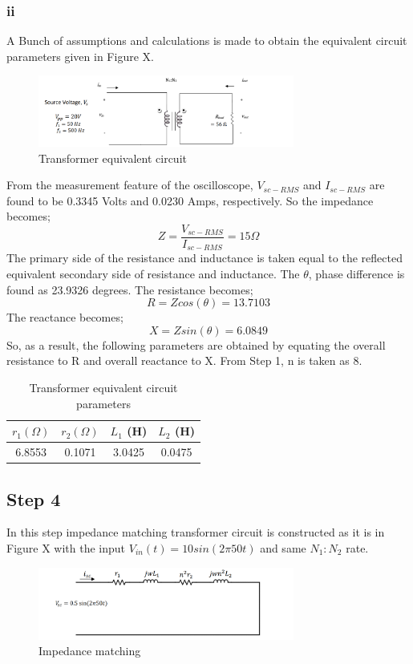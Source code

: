 \documentclass[letterpaper,12pt]{article}
\begin{document}
\subsubsection{ii}
A Bunch of assumptions and calculations is made to obtain the equivalent circuit parameters given in Figure X.
\begin{figure}[H]
    \centering
    \includegraphics[width = 0.75\textwidth]{2.png}
    \caption{Transformer equivalent circuit}
\end{figure} 
From the measurement feature of the oscilloscope, \(V_{sc-RMS}\) and \(I_{sc-RMS}\) are found to be 0.3345 Volts and 0.0230 Amps, respectively. So the impedance becomes;
\[
    Z = \frac{V_{sc-RMS}}{I_{sc-RMS}} = 15 \Omega
    \]
    The primary side of the resistance and inductance is taken equal to the reflected equivalent secondary side of resistance and inductance. The \(\theta\), phase difference is found as 23.9326 degrees. The resistance becomes;
    \[
    R = Z cos (\theta) = 13.7103
    \]
    The reactance becomes;
    \[
    X = Z sin (\theta) = 6.0849 
    \]
    So, as a result, the following parameters are obtained by equating the overall resistance to R and overall reactance to X. From Step 1, n is taken as 8.
    \begin{table}[H]
    \begin{center}
        \caption{Transformer equivalent circuit parameters}
        \vspace{2mm}
        \begin{tabular}{||c | c | c | c ||} 
            \hline
            \(r_1 (\Omega) \) & \(r_2 (\Omega)\)  & \(L_1\) (H) & \(L_2\) (H) \\ [0.5ex] 
            \hline\hline
            6.8553 & 0.1071 & 3.0425 & 0.0475 \\ 
            \hline
        \end{tabular}
    \end{center}
    \end{table}
    

\subsection{Step 4}
In this step impedance matching transformer circuit is constructed as it is in Figure X with the input \(V_{in}(t) = 10sin(2\pi50t)\) and same \(N_1:N_2\) rate. 
\begin{figure}[H]
    \centering
    \includegraphics[width = 0.75\textwidth]{3.png}
    \caption{Impedance matching}
\end{figure} 
\end{document}
